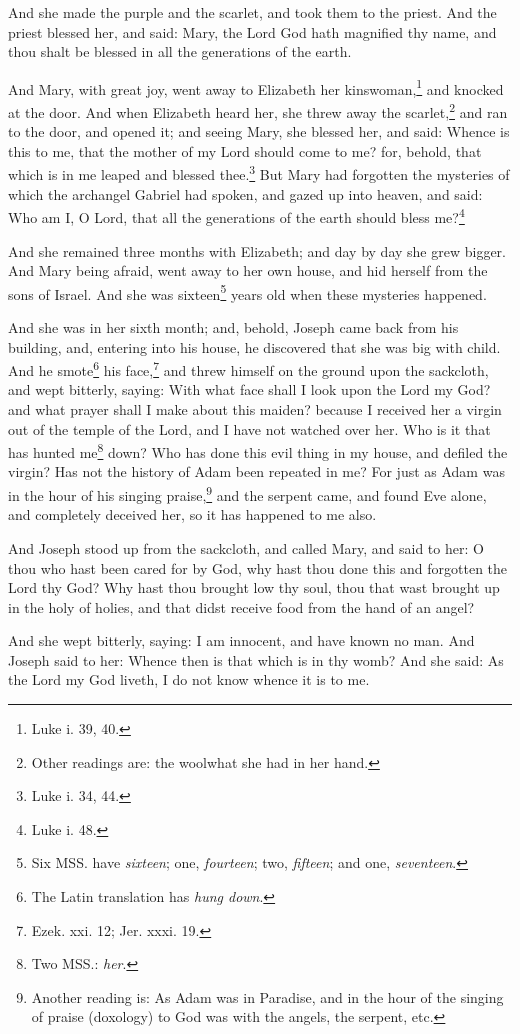 \pend\pstart
{}

\pend\pstart
And she made the purple and the scarlet, and took them to the priest. And the priest blessed her, and said: Mary, the Lord God hath magnified thy name, and thou shalt be blessed in all the generations of the earth.

\pend\pstart
And Mary, with great
joy, went away to Elizabeth her kinswoman,\footnote{Luke i. 39, 40.} and knocked at the door. And when Elizabeth heard her, she threw away the scarlet,\footnote{Other readings are: the wool\textemdash what she had in her hand.} and ran to the door, and opened it; and seeing Mary, she blessed her, and said: Whence is this to me, that the mother of my Lord should come to me? for, behold, that which is in me leaped and blessed thee.\footnote{Luke i. 34, 44.} But Mary had forgotten the mysteries of which the archangel Gabriel had spoken, and gazed up into heaven, and said: Who am I, O Lord, that all the generations of the earth should bless me?\footnote{Luke i. 48.}

\pend\pstart
And she remained three months with Elizabeth; and day by day she grew bigger. And Mary being afraid, went away to her own house, and hid herself from the sons of Israel. And she was sixteen\footnote{Six MSS. have \textit{sixteen}; one, \textit{fourteen}; two, \textit{fifteen}; and one, \textit{seventeen}.} years old when these mysteries happened.

\pend\pstart
{}

\pend\pstart
And she was in her sixth month; and, behold, Joseph came back from his building, and, entering into his house, he discovered that she was big with child. And he smote\footnote{The Latin translation has \textit{hung down}.} his face,\footnote{Ezek. xxi. 12; Jer. xxxi. 19.} and threw himself on the ground upon the sackcloth, and wept bitterly, saying: With what face shall I look upon the Lord my God? and what prayer shall I make about this maiden? because I received her a virgin out of the temple of the Lord, and I have not watched over her. Who is it that has hunted me\footnote{Two MSS.: \textit{her}.} down? Who has done this evil thing in my house, and defiled the virgin? Has not the history of Adam been repeated in me? For just as Adam was in the hour of his singing praise,\footnote{Another reading is: As Adam was in Paradise, and in the hour of the singing of praise (doxology) to God was with the angels, the serpent, etc.} and the serpent came, and found Eve alone, and completely deceived her, so it has happened to me also.

\pend\pstart
And Joseph stood up from the sackcloth, and called Mary, and said to her: O thou who hast been cared for by God, why hast thou done this and forgotten the Lord thy God? Why hast thou brought low thy soul, thou that wast brought up in the holy of holies, and that didst receive food from the hand of an angel?

\pend\pstart
And she wept bitterly, saying: I am innocent, and have known no man. And Joseph said to her: Whence then is that which is in thy womb? And she said: As the Lord my God liveth, I do not know whence it is to me.

\pend\pstart
{}

\pend
